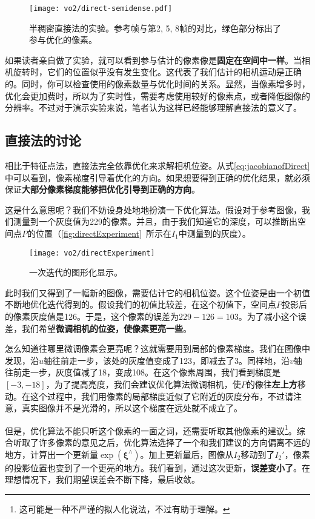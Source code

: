 \begin{figure}[!htp]
	\centering
	\texttt{[image: vo2/direct-semidense.pdf]}
	\caption{半稠密直接法的实验。参考帧与第2, 5, 8帧的对比，绿色部分标出了参与优化的像素。}
	\label{fig:direct-semidense}
\end{figure}

如果读者亲自做了实验，就可以看到参与估计的像素像是\textbf{固定在空间中一样}。当相机旋转时，它们的位置似乎没有发生变化。这代表了我们估计的相机运动是正确的。同时，你可以检查使用的像素数量与优化时间的关系。显然，当像素增多时，优化会更加费时，所以为了实时性，需要考虑使用较好的像素点，或者降低图像的分辨率。不过对于演示实验来说，笔者认为这样已经能够理解直接法的意义了。

\clearpage
\subsection{直接法的讨论}
相比于特征点法，直接法完全依靠优化来求解相机位姿。从式\eqref{eq:jacobianofDirect}中可以看到，像素梯度引导着优化的方向。如果想要得到正确的优化结果，就必须保证\textbf{大部分像素梯度能够把优化引导到正确的方向}。

这是什么意思呢？我们不妨设身处地地扮演一下优化算法。假设对于参考图像，我们测量到一个灰度值为229的像素。并且，由于我们知道它的深度，可以推断出空间点$P$的位置（\autoref{fig:directExperiment}~所示在$I_1$中测量到的灰度）。

\begin{figure}[!htp]
	\centering
	\texttt{[image: vo2/directExperiment]}
	\caption{一次迭代的图形化显示。}
	\label{fig:directExperiment}
\end{figure}

此时我们又得到了一幅新的图像，需要估计它的相机位姿。这个位姿是由一个初值不断地优化迭代得到的。假设我们的初值比较差，在这个初值下，空间点$P$投影后的像素灰度值是126。于是，这个像素的误差为$229-126=103$。为了减小这个误差，我们希望\textbf{微调相机的位姿，使像素更亮一些}。

怎么知道往哪里微调像素会更亮呢？这就需要用到局部的像素梯度。我们在图像中发现，沿$u$轴往前走一步，该处的灰度值变成了123，即减去了3。同样地，沿$v$轴往前走一步，灰度值减了18，变成108。在这个像素周围，我们看到梯度是$[-3,-18]$，为了提高亮度，我们会建议优化算法微调相机，使$P$的像往\textbf{左上方}移动。在这个过程中，我们用像素的局部梯度近似了它附近的灰度分布，不过请注意，真实图像并不是光滑的，所以这个梯度在远处就不成立了。

但是，优化算法不能只听这个像素的一面之词，还需要听取其他像素的建议\footnote{这可能是一种不严谨的拟人化说法，不过有助于理解。}。综合听取了许多像素的意见之后，优化算法选择了一个和我们建议的方向偏离不远的地方，计算出一个更新量$\exp ({\bm{\xi}^\wedge } )$。加上更新量后，图像从$I_2$移动到了$I_2'$，像素的投影位置也变到了一个更亮的地方。我们看到，通过这次更新，\textbf{误差变小了}。在理想情况下，我们期望误差会不断下降，最后收敛。

